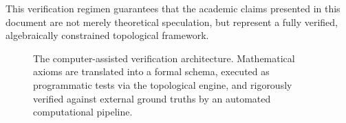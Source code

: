 This verification regimen guarantees that the academic claims presented in this document are not merely theoretical speculation, but represent a fully verified, algebraically constrained topological framework.

\begin{figure}[h]
\centering
{}
\caption{The computer-assisted verification architecture. Mathematical axioms are translated into a formal schema, executed as programmatic tests via the topological engine, and rigorously verified against external ground truths by an automated computational pipeline.}
\label{fig:verification}
\end{figure}
